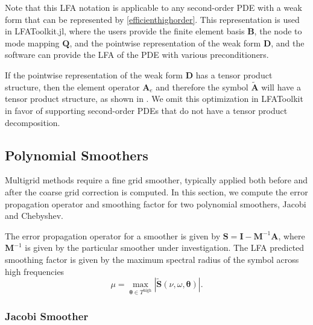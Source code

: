 \documentclass[review]{siamart190516}
\begin{document}
Note that this LFA notation is applicable to any second-order PDE with a weak form that can be represented by \cref{efficienthighorder}.
This representation is used in LFAToolkit.jl, where the users provide the finite element basis $\mathbf{B}$, the node to mode mapping $\mathbf{Q}$, and the pointwise representation of the weak form $\mathbf{D}$, and the software can provide the LFA of the PDE with various preconditioners.

If the pointwise representation of the weak form $\mathbf{D}$ has a tensor product structure, then the element operator $\mathbf{A}_e$ and therefore the symbol $\tilde{\mathbf{A}}$ will have a tensor product structure, as shown in \cite{he2020two}.
We omit this optimization in LFAToolkit in favor of supporting second-order PDEs that do not have a tensor product decomposition.

\subsection{Polynomial Smoothers}\label{sec:smooth}

Multigrid methods require a fine grid smoother, typically applied both before and after the coarse grid correction is computed.
In this section, we compute the error propagation operator and smoothing factor for two polynomial smoothers, Jacobi and Chebyshev.

The error propagation operator for a smoother is given by $\mathbf{S} = \mathbf{I} - \mathbf{M}^{-1} \mathbf{A}$, where $\mathbf{M}^{-1}$ is given by the particular smoother under investigation.
The LFA predicted smoothing factor is given by the maximum spectral radius of the symbol across high frequencies
\begin{equation}
\mu = \max_{\boldsymbol{\theta} \in T^{\text{high}}} \left\lvert \tilde{\mathbf{S}} \left( \nu, \omega, \boldsymbol{\theta} \right) \right\rvert.
\end{equation}

\subsubsection{Jacobi Smoother}\label{sec:jacobi}
\end{document}

